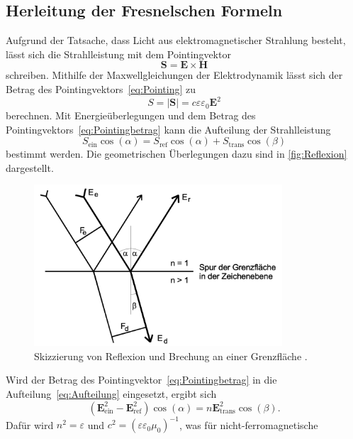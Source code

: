 \subsection{Herleitung der Fresnelschen Formeln}
Aufgrund der Tatsache, dass Licht aus elektromagnetischer Strahlung besteht, lässt sich die 
Strahlleistung mit dem Pointingvektor
\begin{equation*}
    \symbf{S} = \symbf{E} \times \symbf{H}
    \label{eq:Pointing}
\end{equation*}
schreiben. Mithilfe der Maxwellgleichungen der Elektrodynamik lässt sich der Betrag des 
Pointingvektors~\eqref{eq:Pointing} zu
\begin{equation}
    S = |\symbf{S}| = c \varepsilon \varepsilon_0 \symbf{E}^2
    \label{eq:Pointingbetrag}
\end{equation}
berechnen. Mit Energieüberlegungen und dem Betrag des Pointingvektors~\eqref{eq:Pointingbetrag} kann
die Aufteilung der Strahlleistung 
\begin{equation}
    S_{\text{ein}} \cos(\alpha) = S_{\text{ref}} \cos(\alpha) + S_{\text{trans}} \cos(\beta)
    \label{eq:Aufteilung}
\end{equation}
bestimmt werden. Die geometrischen Überlegungen dazu sind in \autoref{fig:Reflexion} dargestellt.
\begin{figure}[H]
    \centering
    \includegraphics[height=6cm]{content/pics/Reflexion.png}
    \caption{Skizzierung von Reflexion und Brechung an einer Grenzfläche \cite{v407}.}
    \label{fig:Reflexion}
\end{figure}
Wird der Betrag des Pointingvektor~\eqref{eq:Pointingbetrag} in die Aufteilung~\eqref{eq:Aufteilung} 
eingesetzt, ergibt sich
\begin{equation}
    (\symbf{E}_{\text{ein}}^2 - \symbf{E}_{\text{ref}}^2)\cos(\alpha) = n \symbf{E}_{\text{trans}}^2 \cos(\beta).
\end{equation}
Dafür wird $n^2=\varepsilon$ und $c^2 = (\varepsilon \varepsilon_0 \mu_0)^{-1}$, was für nicht-ferromagnetische
